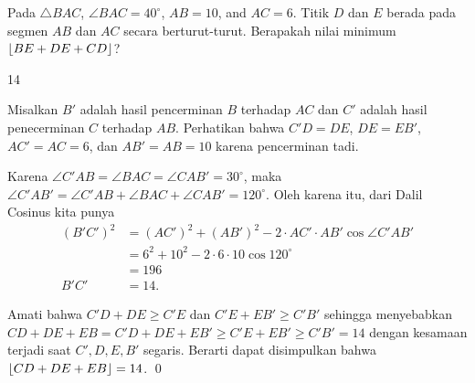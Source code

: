 \documentclass[12pt]{scrartcl}
\begin{document}
	\begin{soalbaru}
		Pada $\triangle BAC$, $\angle BAC = 40^\circ$, $AB=10$, and $AC=6$. Titik $D$ dan $E$ berada pada segmen $AB$ dan $AC$ secara berturut-turut. Berapakah nilai minimum $\left\lfloor BE+DE+CD \right\rfloor$?
		
		\begin{jawaban}
		14
		\end{jawaban}
		\begin{solusi}
		Misalkan $B'$ adalah hasil pencerminan $B$ terhadap $AC$ dan $C'$ adalah hasil penecerminan $C$ terhadap $AB$. Perhatikan bahwa $C'D=DE$, $DE=EB'$, $AC'=AC=6$, dan $AB'=AB=10$ karena pencerminan tadi. 
		
		Karena $\angle C'AB = \angle BAC = \angle CAB'=30^\circ$, maka $\angle C'AB' = \angle C'AB + \angle BAC + \angle CAB' = 120^\circ$. Oleh karena itu, dari Dalil Cosinus kita punya 
		\begin{align*}
		(B'C')^2 &= (AC')^2+(AB')^2-2\cdot AC' \cdot AB' \cos \angle C'AB'\\
		&= 6^2+10^2-2\cdot 6\cdot 10 \cos 120^\circ\\
		&= 196\\
		B'C' &= 14.
		\end{align*} 
		
		Amati bahwa $C'D+DE \ge C'E$ dan $C'E+EB' \ge C'B'$ sehingga menyebabkan \\$CD+DE+EB=C'D+DE+EB' \ge C'E +EB' \ge C'B'=14$ dengan kesamaan terjadi saat $C',D,E,B'$ segaris. Berarti dapat disimpulkan bahwa $\left\lfloor CD+DE+EB \right\rfloor=14$. \qed
		\end{solusi}
	\end{soalbaru}
	
\end{document}
